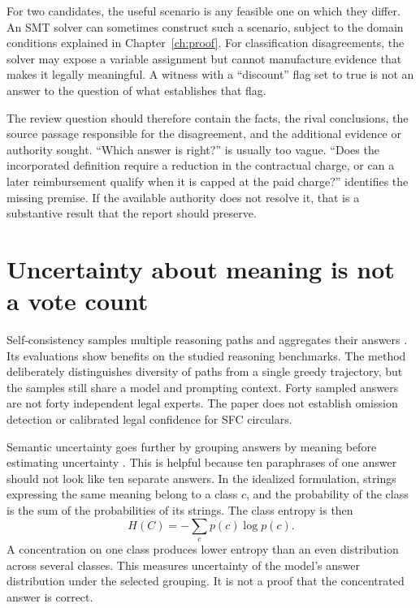 \documentclass[12pt,a4paper,oneside,openany]{book}
\begin{document}
For two candidates, the useful scenario is any feasible one on which they differ.
An SMT solver can sometimes construct such a scenario, subject to the domain
conditions explained in Chapter~\ref{ch:proof}. For classification disagreements,
the solver may expose a variable assignment but cannot manufacture evidence that
makes it legally meaningful. A witness with a ``discount'' flag set to true is not
an answer to the question of what establishes that flag.

The review question should therefore contain the facts, the rival conclusions,
the source passage responsible for the disagreement, and the additional evidence
or authority sought. ``Which answer is right?'' is usually too vague. ``Does the
incorporated definition require a reduction in the contractual charge, or can a
later reimbursement qualify when it is capped at the paid charge?'' identifies
the missing premise. If the available authority does not resolve it, that is a
substantive result that the report should preserve.

\section{Uncertainty about meaning is not a vote count}
\label{merge:M05:09}


Self-consistency samples multiple reasoning paths and aggregates their answers
\citep[section 2]{selfconsistency2023}. Its evaluations show benefits on the
studied reasoning benchmarks. The method deliberately distinguishes diversity of
paths from a single greedy trajectory, but the samples still share a model and
prompting context. Forty sampled answers are not forty independent legal experts.
The paper does not establish omission detection or calibrated legal confidence
for SFC circulars.

Semantic uncertainty goes further by grouping answers by meaning before
estimating uncertainty \citep[sections 3--4]{semantic2023}. This is helpful because
ten paraphrases of one answer should not look like ten separate answers. In the
idealized formulation, strings expressing the same meaning belong to a class
$c$, and the probability of the class is the sum of the probabilities of its
strings. The class entropy is then
\begin{equation}
 H(C)=-\sum_c p(c)\log p(c).
 \label{eq:semantic-entropy}
\end{equation}
A concentration on one class produces lower entropy than an even distribution
across several classes. This measures uncertainty of the model's answer
distribution under the selected grouping. It is not a proof that the concentrated
answer is correct.
\end{document}
